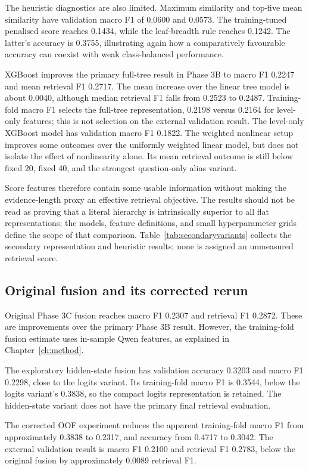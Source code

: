 The heuristic diagnostics are also limited. Maximum similarity and
top-five mean similarity have validation macro F1 of 0.0600 and
0.0573. The training-tuned penalised score reaches 0.1434, while
the leaf-breadth rule reaches 0.1242. The latter's accuracy is
0.3755, illustrating again how a comparatively favourable accuracy
can coexist with weak class-balanced performance.

XGBoost improves the primary full-tree result in Phase 3B to
macro F1 0.2247 and mean retrieval F1 0.2717. The mean increase
over the linear tree model is about 0.0040, although median retrieval
F1 falls from 0.2523 to 0.2487. Training-fold macro F1 selects the
full-tree representation, 0.2198 versus 0.2164 for level-only features;
this is not selection on the external validation result.
The level-only XGBoost model has validation macro F1 0.1822.
The weighted nonlinear setup improves some outcomes over the
uniformly weighted linear model, but does not isolate the effect of
nonlinearity alone. Its mean retrieval outcome is still below fixed
20, fixed 40, and the strongest question-only alias variant.

Score features therefore contain some usable information without
making the evidence-length proxy an effective retrieval objective.
The results should not be read as proving that a literal hierarchy
is intrinsically superior to all flat representations; the models,
feature definitions, and small hyperparameter grids define the
scope of that comparison.
Table~\ref{tab:secondaryvariants} collects the secondary representation
and heuristic results; none is assigned an unmeasured retrieval score.

\subsection{Original fusion and its corrected rerun}
Original Phase 3C fusion reaches macro F1 0.2307 and retrieval F1
0.2872. These are improvements over the primary Phase 3B result.
However, the training-fold fusion estimate uses in-sample Qwen
features, as explained in Chapter~\ref{ch:method}.

The exploratory hidden-state fusion has validation accuracy 0.3203
and macro F1 0.2298, close to the logits variant. Its training-fold
macro F1 is 0.3544, below the logits variant's 0.3838, so the
compact logits representation is retained. The hidden-state variant
does not have the primary final retrieval evaluation.

The corrected OOF experiment reduces the apparent training-fold
macro F1 from approximately 0.3838 to 0.2317, and accuracy from
0.4717 to 0.3042. The external validation result is macro F1
0.2100 and retrieval F1 0.2783, below the original fusion by
approximately 0.0089 retrieval F1.

